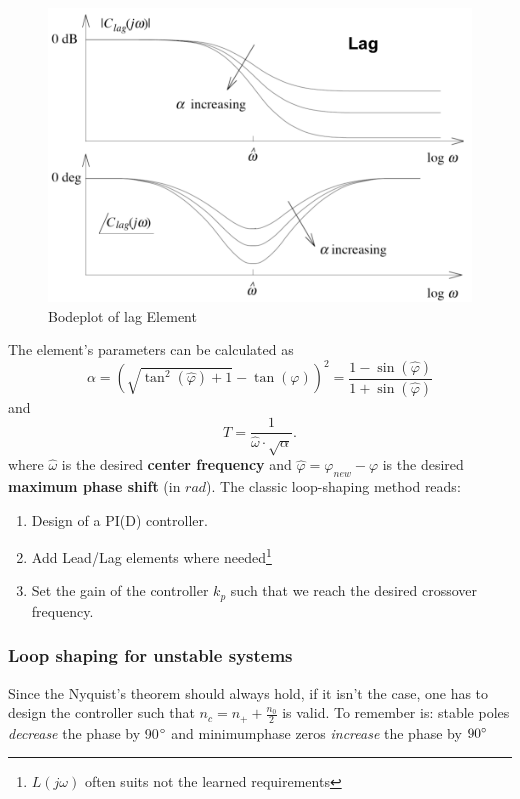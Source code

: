 \documentclass[a4paper,12 pt]{article}
\numberwithin{equation}{section}
\theoremstyle{definition}
\theoremstyle{remark}
\theoremstyle{definition}
\theoremstyle{definition}
\theoremstyle{definition}
\theoremstyle{remark}
\begin{document}
\begin{figure}[h!]
\begin{center}
\includegraphics[width=0.65\columnwidth]{lag.png}
\caption{Bodeplot of lag Element}
\label{fig:lag}
\end{center}
\end{figure}
 
The element's parameters can be calculated as
\begin{equation}
\alpha=\left( \sqrt{\tan^2(\hat{\varphi})+1} -\tan(\varphi)\right)^2=\frac{1-\sin(\hat{\varphi})}{1+\sin(\hat{\varphi})}
\end{equation}
and
\begin{equation}
T=\frac{1}{\hat{\omega}\cdot \sqrt{\alpha}}.
\end{equation}
where $\hat{\omega}$ is the desired \textbf{center frequency} and $\hat{\varphi}=\varphi_{new}-\varphi$ is the desired \textbf{maximum phase shift} (in $rad$).
The classic loop-shaping method reads:
\begin{enumerate}
\item Design of a PI(D) controller.
\item Add Lead/Lag elements where needed\footnote{$L(j\omega)$ often suits not the learned requirements}
\item Set the gain of the controller $k_p$ such that we reach the desired crossover frequency.
\end{enumerate}
\newpage
\subsubsection{Loop shaping for unstable systems}
Since the Nyquist's theorem should always hold, if it isn't the case, one has to design the controller such that $n_c=n_+ +\frac{n_0}{2}$ is valid. To remember is: stable poles \textit{decrease} the phase by 90$\degree$ and minimumphase zeros \textit{increase} the phase by $ 90\degree$
\end{document}
